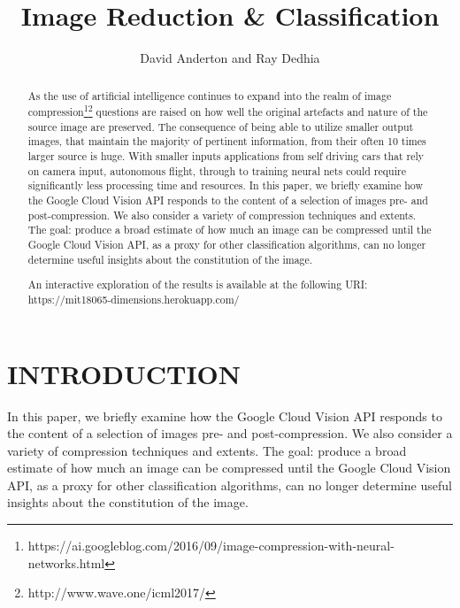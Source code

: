 \documentclass[letterpaper, 10 pt, conference]{ieeeconf}  %
\title{\LARGE \bf Image Reduction \& Classification}
\author{David Anderton and Ray Dedhia}
\begin{document}
\maketitle
\thispagestyle{empty}
\pagestyle{empty}


\begin{abstract}

As the use of artificial intelligence continues to expand into the realm of image compression\footnote{https://ai.googleblog.com/2016/09/image-compression-with-neural-networks.html}\footnote{http://www.wave.one/icml2017/} questions are raised on how well the original artefacts and nature of the source image are preserved. The consequence of being able to utilize smaller output images, that maintain the majority of pertinent information, from their often 10 times larger source is huge. With smaller inputs applications from self driving cars that rely on camera input, autonomous flight, through to training neural nets could require significantly less processing time and resources.
In this paper, we briefly examine how the Google Cloud Vision API responds to the content of a selection of images pre- and post-compression. We also consider a variety of compression techniques and extents. The goal: produce a broad estimate of how much an image can be compressed until the Google Cloud Vision API, as a proxy for other classification algorithms, can no longer determine useful insights about the constitution of the image.

An interactive exploration of the results is available at the following URI: https://mit18065-dimensions.herokuapp.com/

\end{abstract}

\section{INTRODUCTION}

In this paper, we briefly examine how the Google Cloud Vision API responds to the content of a selection of images pre- and post-compression. We also consider a variety of compression techniques and extents. The goal: produce a broad estimate of how much an image can be compressed until the Google Cloud Vision API, as a proxy for other classification algorithms, can no longer determine useful insights about the constitution of the image.
\end{document}
